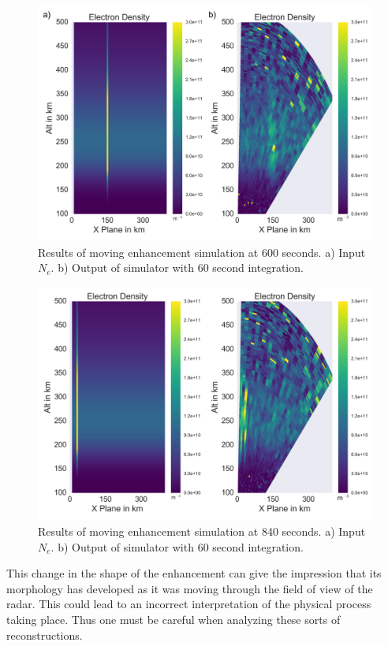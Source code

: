 \documentclass[draft,ras]{agutex}
\begin{document}
\begin{article}
\begin{figure}[!t]
\centering
\includegraphics[width=6in]{moving6mins}
\caption{Results of moving enhancement simulation at 600 seconds. a) Input $N_e$. b) Output of simulator with 60 second integration.}
\label{fig:moving10mins}
\end{figure}


\begin{figure}[!t]
\centering
\includegraphics[width=6in]{moving14mins}
\caption{Results of moving enhancement simulation at 840 seconds. a) Input $N_e$. b) Output of simulator with 60 second integration.}
\label{fig:moving14mins}
\end{figure}

This change in the shape of the enhancement can give the impression that its morphology has developed as it was moving through the field of view of the radar. This could lead to an incorrect interpretation of the physical process taking place. Thus one must be careful when analyzing these sorts of reconstructions.


\end{article}
\end{document}

